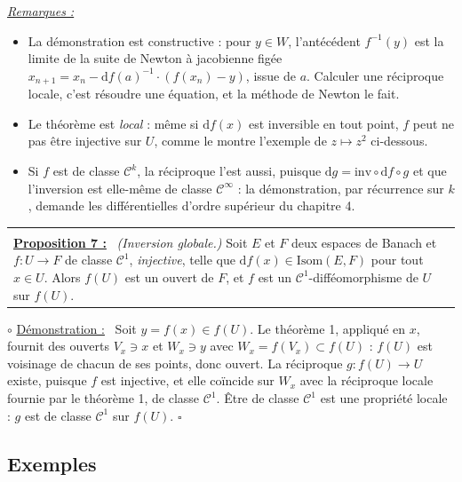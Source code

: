 \documentclass[a4paper,twoside]{report}
\makeatletter
\newenvironment{cadre}%
 {\par\vspace{2mm}\noindent\begin{tabular}{|@{\hspace{4mm}}p{0.93\textwidth}@{\hspace{4mm}}|}
  \hline \\[-2mm]}%
 {\\[2mm] \hline \end{tabular}\par\vspace{3mm}}
\newcommand{\propo}[1]{\textbf{\underline{Proposition #1 :}}~}
\newenvironment{demo}%
 {\par\needspace{4\baselineskip}\vspace{1mm}\noindent$\circ$ \underline{Démonstration :}~\setlength{\parskip}{3pt plus 1pt}}%
 {\hfill$\square$\par\vspace{2mm}}
\newenvironment{remarques}%
 {\par\needspace{6\baselineskip}\vspace{1mm}\begin{list}{}{\leftmargin=1cm \rightmargin=0.5cm}\item[]%
  \textit{\underline{Remarques :}}%
  \begin{itemize}[label=$\bullet$,leftmargin=0.45cm,topsep=3pt,itemsep=4pt]}%
 {\end{itemize}\end{list}\vspace{1mm}}
\newcommand{\dd}{\mathrm{d}}                      %
\newcommand{\Cc}{\mathcal{C}}                     %
\newcommand{\Isom}{\mathrm{Isom}}                 %
\makeatother
\begin{document}
\begin{remarques}
  \item La démonstration est constructive : pour $y \in W$, l'antécédent $f^{-1}(y)$ est la limite de la suite de Newton à jacobienne figée $x_{n + 1} = x_{n} - \dd f(a)^{-1}\cdot(f(x_{n}) - y)$, issue de $a$. Calculer une réciproque locale, c'est résoudre une équation, et la méthode de Newton le fait.
  \item Le théorème est \emph{local} : même si $\dd f(x)$ est inversible en tout point, $f$ peut ne pas être injective sur $U$, comme le montre l'exemple de $z \mapsto z^{2}$ ci-dessous.
  \item Si $f$ est de classe $\Cc^{k}$, la réciproque l'est aussi, puisque $\dd g = \mathrm{inv} \circ \dd f \circ g$ et que l'inversion est elle-même de classe $\Cc^{\infty}$ : la démonstration, par récurrence sur $k$, demande les différentielles d'ordre supérieur du chapitre 4.
\end{remarques}

\begin{cadre}
\propo{7} \emph{(Inversion globale.)} Soit $E$ et $F$ deux espaces de Banach et $f : U \to F$ de classe $\Cc^{1}$, \emph{injective}, telle que $\dd f(x) \in \Isom(E, F)$ pour tout $x \in U$. Alors $f(U)$ est un ouvert de $F$, et $f$ est un $\Cc^{1}$-difféomorphisme de $U$ sur $f(U)$.
\end{cadre}

\begin{demo}
Soit $y = f(x) \in f(U)$. Le théorème 1, appliqué en $x$, fournit des ouverts $V_{x} \ni x$ et $W_{x} \ni y$ avec $W_{x} = f(V_{x}) \subset f(U)$ : $f(U)$ est voisinage de chacun de ses points, donc ouvert. La réciproque $g : f(U) \to U$ existe, puisque $f$ est injective, et elle coïncide sur $W_{x}$ avec la réciproque locale fournie par le théorème 1, de classe $\Cc^{1}$. Être de classe $\Cc^{1}$ est une propriété locale : $g$ est de classe $\Cc^{1}$ sur $f(U)$.
\end{demo}

\newpage
\subsection{Exemples}
\end{document}
